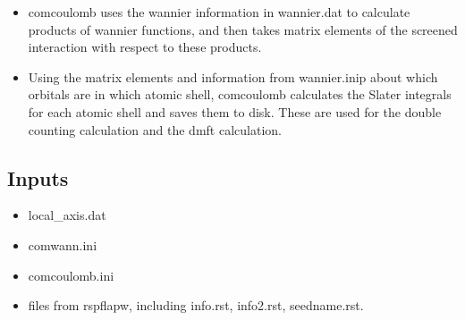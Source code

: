 \documentclass[aps,prb,singlecolumn,preprintnumbers,amsmath,amssymb]{revtex4}
\begin{document}
\begin{itemize}
\item comcoulomb uses the wannier information in wannier.dat to calculate products of wannier functions, and then takes matrix elements of the screened interaction with respect to these products.
\item Using the matrix elements and information from wannier.inip about which orbitals are in which atomic shell, comcoulomb calculates the Slater integrals for each atomic shell and saves them to disk.  These are used for the double counting calculation and the dmft calculation.
\end{itemize}

\subsection{Inputs}
\begin{itemize}
\item local\_axis.dat
\item comwann.ini
\item comcoulomb.ini
\item files from rspflapw, including info.rst, info2.rst, seedname.rst.
\end{itemize}
\end{document}
